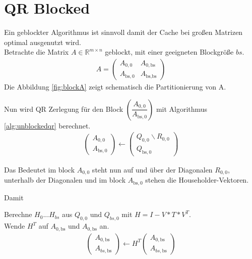 \section{QR Blocked}
Ein geblockter Algorithmus ist sinnvoll damit der Cache bei großen Matrizen optimal ausgenutzt wird. \\


Betrachte die Matrix $A \in \mathbb{R}^{m \times n}$ geblockt, mit einer geeigneten Blockgröße $bs$.
\begin{align}
	A = \left(\begin{array}{l|l}
	A_{0, 0} & A_{0, \text{bs}} \\ \hline
	A_{\text{bs}, 0}   & A_{\text{bs}, \text{bs}} 	
	\end{array} \right) \label{equ:blockA}
\end{align}
Die Abbildung \ref{fig:blockA} zeigt schematisch die Partitionierung von A.

Nun wird QR Zerlegung für den Block $ \left(\dfrac{A_{0, 0}}{A_{\text{bs}, 0}} \right)$
mit Algorithmus \ref{alg:unblockedqr} berechnet.
\begin{align}
	\left(\begin{array}{l} 
	A_{0, 0} \\ \hline
	A_{\text{bs}, 0}
	\end{array}\right)
	\leftarrow
	\left(\begin{array}{l} 
	Q_{0, 0}  \backslash R_{0,0} \\ \hline
	Q_{\text{bs}, 0} 
	\end{array}\right)
\end{align}

Das Bedeutet im block $A_{0, 0}$ steht nun auf und über der Diagonalen $R_{0,0}$, unterhalb der Diagonalen und im block $A_{\text{bs}, 0}$ stehen die Householder-Vektoren.

Damit 



Berechne $H_{0}$...$H_{bs}$ aus $Q_{0, 0}$ und $Q_{bs, 0}$ mit $H = I - V*T*V^T$.\\
Wende $H^T$ auf $A_{0, \text{bs}}$ und $ A_{0,\text{bs}}$ an.
\begin{align}
	\left(\begin{array}{l} 
	A_{0, \text{bs}} \\ \hline
	A_{bs, \text{bs}}
	\end{array}\right)
	\leftarrow
	H^T \left(\begin{array}{l} 
	A_{0, \text{bs}} \\ \hline
	A_{bs, \text{bs}}
	\end{array}\right)
\end{align}

